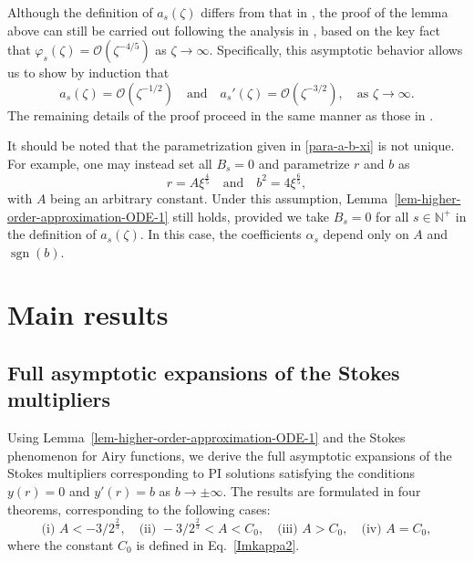 \documentclass[12pt]{article}
\theoremstyle{plain}
\theoremstyle{definition}
\newtheorem{remark}{\hskip\parindent Remark}
\numberwithin{equation}{section}
\newcommand\sgn{\operatorname{sgn}}
\begin{document}
\begin{remark}
Although the definition of $a_{s}(\zeta)$ differs from that in \cite[Lemma 1]{Long-Jiang-Li}, the proof of the lemma above can still be carried out following the analysis in \cite[Section 3]{Long-Jiang-Li}, based on the key fact that $\varphi_{s}(\zeta) = \mathcal{O}(\zeta^{-4/5})$ as $\zeta \to \infty$. Specifically, this asymptotic behavior allows us to show by induction that
\begin{equation}
a_{s}(\zeta) = \mathcal{O}(\zeta^{-1/2}) \quad \text{and} \quad a_{s}'(\zeta) = \mathcal{O}(\zeta^{-3/2}), \quad \text{as } \zeta \to \infty.
\end{equation}
The remaining details of the proof proceed in the same manner as those in \cite[Section 3]{Long-Jiang-Li}.
\end{remark}


\begin{remark}
It should be noted that the parametrization given in \eqref{para-a-b-xi} is not unique. For example, one may instead set all $B_{s} = 0$ and parametrize $r$ and $b$ as
\begin{equation}\label{para-a-b-xi-2}
r = A\xi^{\frac45}\quad\text{and}\quad b^2 = 4\xi^{\frac65},
\end{equation}
with $A$ being an arbitrary constant. Under this assumption, Lemma~\ref{lem-higher-order-approximation-ODE-1} still holds, provided we take $B_{s} = 0$ for all $s \in \mathbb{N}^{+}$ in the definition of $a_{s}(\zeta)$. In this case, the coefficients $\alpha_{s}$ depend only on $A$ and $\sgn(b)$.
\end{remark}


\section{Main results}
\label{sec:results}

\subsection{Full asymptotic expansions of the Stokes multipliers}


Using Lemma~\ref{lem-higher-order-approximation-ODE-1} and the Stokes phenomenon for Airy functions, we derive the full asymptotic expansions of the Stokes multipliers corresponding to PI solutions satisfying the conditions $y(r) = 0$ and $y'(r) = b$ as $b \to \pm\infty$. The results are formulated in four theorems, corresponding to the following cases:
\begin{equation}
\text{(i) } A<-3/2^{\frac{2}{3}}, \quad
\text{(ii) } -3/2^{\frac{2}{3}}<A<C_{0},\quad
\text{(iii) } A>C_{0}, \quad
\text{(iv) } A=C_{0},
\end{equation}
where the constant $C_{0}$ is defined in Eq.~\eqref{Imkappa2}.
\end{document}
